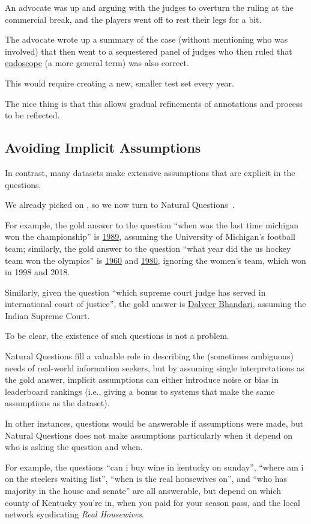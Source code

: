 An advocate was up and arguing with the
judges to overturn the ruling at the commercial break, and the players went off to rest their legs for a bit.

The advocate wrote up a summary of the case (without mentioning who was
involved) that then went to a sequestered panel of judges who then
ruled that \underline{endoscope} (a more general term) was also correct.

This would require creating a new, smaller test set every year.

The nice thing is that this allows gradual refinements of annotations
and process to be reflected.

\subsection{Avoiding Implicit Assumptions}

In contrast, many datasets make extensive assumptions that are explicit in the questions.

We already picked on \squad{}, so we now turn to Natural Questions~\citep{kwiatkowski-19}.

For example, the gold answer to the question ``when was the last time michigan won the championship'' is \underline{1989}, assuming the University of Michigan's football team; similarly, the gold answer to the question ``what year did the us hockey team won the olympics'' is \underline{1960} and \underline{1980}, ignoring the  women's team, which won in 1998 and 2018.

Similarly, given the question ``which supreme court judge has served in international court of justice'', the gold answer is \underline{Dalveer Bhandari}, assuming the Indian Supreme Court.

To be clear, the existence of such questions is not a problem.

Natural Questions fill a valuable role in describing the (sometimes ambiguous) needs of real-world information seekers, but by assuming single interpretations as the gold answer, implicit assumptions can either introduce noise or bias in leaderboard rankings (i.e., giving a bonus to systems that make the same assumptions as the dataset).


In other instances, questions would be answerable if assumptions were made, but Natural Questions does not make assumptions particularly when it depend on who is asking the question and when.

For example, the questions ``can i buy wine in kentucky on sunday'', ``where am i on the steelers waiting list'', ``when is the real housewives on'', and ``who has majority in the house and senate'' are all answerable, but depend on which county of Kentucky you're in,
  when you paid for your season pass, and the local network
  syndicating \textit{Real Housewives}.

